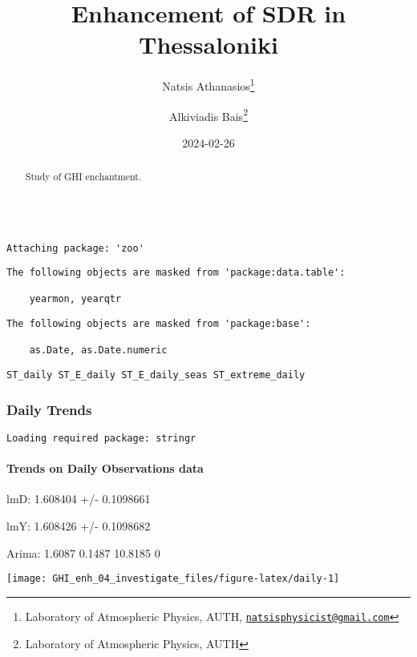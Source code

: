 \documentclass[
  10pt,
  a4paper,oneside]{article}
\title{Enhancement of SDR in Thessaloniki}
\author{Natsis Athanasios\footnote{Laboratory of Atmospheric Physics, AUTH, \href{mailto:natsisphysicist@gmail.com}{\nolinkurl{natsisphysicist@gmail.com}}} \and Alkiviadis Bais\footnote{Laboratory of Atmospheric Physics, AUTH}}
\date{2024-02-26}
\begin{document}
\maketitle
\begin{abstract}
Study of GHI enchantment.
\end{abstract}

{
\hypersetup{linkcolor=}
\setcounter{tocdepth}{4}
\tableofcontents
}
\begin{verbatim}

Attaching package: 'zoo'
\end{verbatim}

\begin{verbatim}
The following objects are masked from 'package:data.table':

    yearmon, yearqtr
\end{verbatim}

\begin{verbatim}
The following objects are masked from 'package:base':

    as.Date, as.Date.numeric
\end{verbatim}

\begin{verbatim}
ST_daily ST_E_daily ST_E_daily_seas ST_extreme_daily
\end{verbatim}

\newpage
\FloatBarrier

\hypertarget{daily-trends}{%
\subsubsection{Daily Trends}\label{daily-trends}}

\newpage

\begin{verbatim}
Loading required package: stringr
\end{verbatim}

\hypertarget{trends-on-daily-observations-data}{%
\paragraph{Trends on Daily Observations data}\label{trends-on-daily-observations-data}}

lmD: 1.608404 +/- 0.1098661

lmY: 1.608426 +/- 0.1098682

Arima: 1.6087 0.1487 10.8185 0

\begin{center}\texttt{[image: GHI\_enh\_04\_investigate\_files/figure-latex/daily-1]} \end{center}
\end{document}

